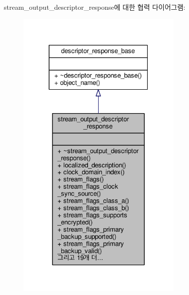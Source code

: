 stream\+\_\+output\+\_\+descriptor\+\_\+response에 대한 협력 다이어그램\+:
\nopagebreak
\begin{figure}[H]
\begin{center}
\leavevmode
\includegraphics[width=232pt]{classavdecc__lib_1_1stream__output__descriptor__response__coll__graph}
\end{center}
\end{figure}
